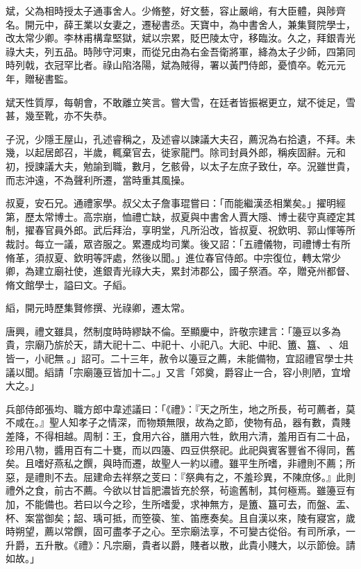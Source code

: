 \begin{pinyinscope}
 斌，父為相時授太子通事舍人。少脩整，好文藝，容止嚴峭，有大臣體，與陟齊名。開元中，薛王業以女妻之，遷秘書丞。天寶中，為中書舍人，兼集賢院學士，改太常少卿。李林甫構韋堅獄，斌以宗累，貶巴陵太守，移臨汝。久之，拜銀青光祿大夫，列五品。時陟守河東，而從兄由為右金吾衛將軍，絳為太子少師，四第同時列戟，衣冠罕比者。祿山陷洛陽，斌為賊得，署以黃門侍郎，憂憤卒。乾元元年，贈秘書監。



 斌天性質厚，每朝會，不敢離立笑言。嘗大雪，在廷者皆振裾更立，斌不徙足，雪甚，幾至靴，亦不失恭。



 子況，少隱王屋山，孔述睿稱之，及述睿以諫議大夫召，薦況為右拾遺，不拜。未幾，以起居郎召，半歲，輒棄官去，徙家龍門。除司封員外郎，稱疾固辭。元和初，授諫議大夫，勉諭到職，數月，乞骸骨，以太子左庶子致仕，卒。況雖世貴，而志沖遠，不為聲利所遷，當時重其風操。



 叔夏，安石兄。通禮家學。叔父太子詹事琨嘗曰：「而能繼漢丞相業矣。」擢明經第，歷太常博士。高宗崩，恤禮亡缺，叔夏與中書舍人賈大隱、博士裴守真禋定其制，擢春官員外郎。武后拜治，享明堂，凡所沿改，皆叔夏、祝欽明、郭山惲等所裁討。每立一議，眾咨服之。累遷成均司業。後又詔：「五禮儀物，司禮博士有所脩革，須叔夏、欽明等評處，然後以聞。」進位春官侍郎。中宗復位，轉太常少卿，為建立廟社使，進銀青光祿大夫，累封沛郡公，國子祭酒。卒，贈兗州都督、脩文館學士，謚曰文。子縚。



 縚，開元時歷集賢修撰、光祿卿，遷太常。



 唐興，禮文雖具，然制度時時繆缺不倫。至顯慶中，許敬宗建言：「籩豆以多為貴，宗廟乃旂於天，請大祀十二、中祀十、小祀八。大祀、中祀、簠、簋、、俎皆一，小祀無。」詔可。二十三年，赦令以籩豆之薦，未能備物，宜詔禮官學士共議以聞。縚請「宗廟籩豆皆加十二。」又言「郊奠，爵容止一合，容小則陋，宜增大之。」



 兵部侍郎張均、職方郎中韋述議曰：「《禮》：『天之所生，地之所長，茍可薦者，莫不咸在。』聖人知孝子之情深，而物類無限，故為之節，使物有品，器有數，貴賤差降，不得相越。周制：王，食用六谷，膳用六牲，飲用六清，羞用百有二十品，珍用八物，醬用百有二十甕，而以四籩、四豆供祭祀。此祀與賓客豐省不得同，舊矣。且嗜好燕私之饌，與時而遷，故聖人一約以禮。雖平生所嗜，非禮則不薦；所惡，是禮則不去。屈建命去祥祭之芰曰：『祭典有之，不羞珍異，不陳庶侈。』此則禮外之食，前古不薦。今欲以甘旨肥濃皆充於祭，茍逾舊制，其何極焉。雖籩豆有加，不能備也。若曰以今之珍，生所嗜愛，求神無方，是簠、簋可去，而盤、盂、杯、案當御矣；韶、瑀可抵，而箜篌、笙、笛應奏矣。且自漢以來，陵有寢宮，歲時朔望，薦以常饌，固可盡孝子之心。至宗廟法享，不可變古從俗。有司所承，一升爵，五升散。《禮》：凡宗廟，貴者以爵，賤者以散，此貴小賤大，以示節儉。請如故。」




\end{pinyinscope}
